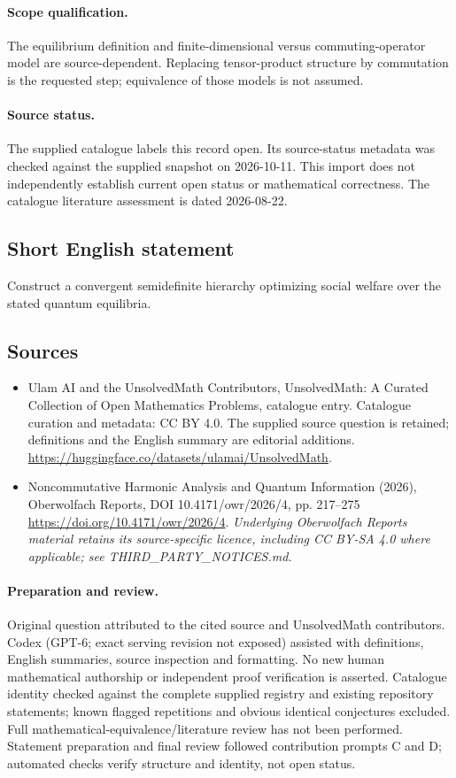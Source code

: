 \documentclass[11pt]{article}
\begin{document}
\paragraph{Scope qualification.}
The equilibrium definition and finite-dimensional versus commuting-operator model are source-dependent. Replacing tensor-product structure by commutation is the requested step; equivalence of those models is not assumed.
\paragraph{Source status.}
The supplied catalogue labels this record open. Its source-status metadata was checked against the supplied snapshot on 2026-10-11. This import does not independently establish current open status or mathematical correctness. The catalogue literature assessment is dated 2026-08-22.
\subsection{Short English statement}
Construct a convergent semidefinite hierarchy optimizing social welfare over the stated quantum equilibria.
\subsection{Sources}
\begin{itemize}
\item[S1] Ulam AI and the UnsolvedMath Contributors, UnsolvedMath: A Curated Collection of Open Mathematics Problems, catalogue entry. Catalogue curation and metadata: CC BY 4.0. The supplied source question is retained; definitions and the English summary are editorial additions.
\url{https://huggingface.co/datasets/ulamai/UnsolvedMath}.
\item[S2] Noncommutative Harmonic Analysis and Quantum Information (2026), Oberwolfach Reports, DOI 10.4171/owr/2026/4, pp. 217--275
\url{https://doi.org/10.4171/owr/2026/4}.
\textit{Underlying Oberwolfach Reports material retains its source-specific licence, including CC BY-SA 4.0 where applicable; see THIRD\_PARTY\_NOTICES.md.}
\end{itemize}
\paragraph{Preparation and review.}
Original question attributed to the cited source and UnsolvedMath contributors. Codex (GPT-6; exact serving revision not exposed) assisted with definitions, English summaries, source inspection and formatting. No new human mathematical authorship or independent proof verification is asserted. Catalogue identity checked against the complete supplied registry and existing repository statements; known flagged repetitions and obvious identical conjectures excluded. Full mathematical-equivalence/literature review has not been performed. Statement preparation and final review followed contribution prompts C and D; automated checks verify structure and identity, not open status.
\label{end:statement}
\end{document}
